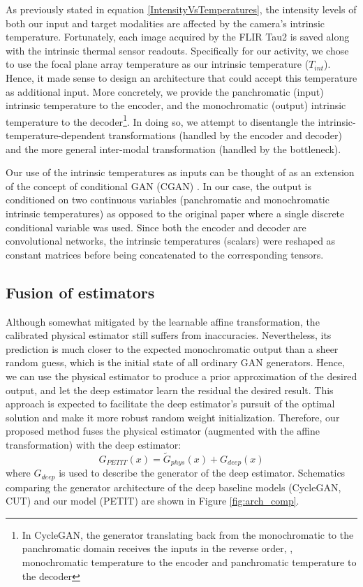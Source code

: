 As previously stated in equation \ref{IntensityVsTemperatures}, the intensity levels of both our input and target modalities are affected by the camera's intrinsic temperature.
Fortunately, each image acquired by the FLIR Tau2 is saved along with the intrinsic thermal sensor readouts.
Specifically for our activity, we chose to use the focal plane array temperature as our intrinsic temperature ($T_\mathit{int}$).
Hence, it made sense to design an architecture that could accept this temperature as additional input.
More concretely, we provide the panchromatic (input) intrinsic temperature to the encoder, and the monochromatic (output) intrinsic temperature to the decoder\footnote{In CycleGAN, the generator translating back from the monochromatic to the panchromatic domain receives the inputs in the reverse order, \ie, monochromatic temperature to the encoder and panchromatic temperature to the decoder}.
In doing so, we attempt to disentangle the intrinsic-temperature-dependent transformations (handled by the encoder and decoder) and the more general inter-modal transformation (handled by the bottleneck).

Our use of the intrinsic temperatures as inputs can be thought of as an extension of the concept of conditional GAN (CGAN) \cite{mirza2014conditional}.
In our case, the output is conditioned on two continuous variables (panchromatic and monochromatic intrinsic temperatures) as opposed to the original paper where a single discrete conditional variable was used.
Since both the encoder and decoder are convolutional networks, the intrinsic temperatures (scalars) were reshaped as constant matrices before being concatenated to the corresponding tensors.

\subsection{Fusion of estimators}
Although somewhat mitigated by the learnable affine transformation, the calibrated physical estimator still suffers from inaccuracies.
Nevertheless, its prediction is much closer to the expected monochromatic output than a sheer random guess, which is the initial state of all ordinary GAN generators.
Hence, we can use the physical estimator to produce a prior approximation of the desired output, and let the deep estimator learn the residual \wrt the desired result.
This approach is expected to facilitate the deep estimator's pursuit of the optimal solution and make it more robust \wrt random weight initialization.
Therefore, our proposed method fuses the physical estimator (augmented with the affine transformation) with the deep estimator:
\begin{equation} \label{eq:genFuse}
  G_{\mathit{PETIT}}(x) = \tilde{G}_\mathit{phys}(x) + G_\mathit{deep}(x)
\end{equation}
where $G_\mathit{deep}$ is used to describe the generator of the deep estimator.
Schematics comparing the generator architecture of the deep baseline models (CycleGAN, CUT) and our model (PETIT) are shown in Figure \ref{fig:arch_comp}.

